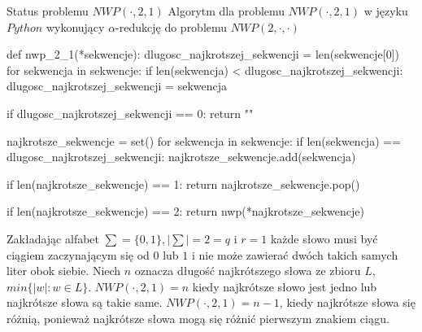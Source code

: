 \documentclass{article}
\begin{document}
\begin{section}
{Status problemu $NWP(\cdot, 2, 1)$}
Algorytm dla problemu $NWP(\cdot, 2, 1)$ w języku $Python$ wykonujący $\alpha$-redukcję do problemu $NWP(2, \cdot, \cdot)$
\begin{python}
def nwp_2_1(*sekwencje):
    dlugosc_najkrotszej_sekwencji = len(sekwencje[0])
    for sekwencja in sekwencje:
        if len(sekwencja) < dlugosc_najkrotszej_sekwencji:
            dlugosc_najkrotszej_sekwencji = sekwencja
    
    if dlugosc_najkrotszej_sekwencji == 0:
        return ""
            
    najkrotsze_sekwencje = set()
    for sekwencja in sekwencje:
        if len(sekwencja) == dlugosc_najkrotszej_sekwencji:
            najkrotsze_sekwencje.add(sekwencja)
            
    if len(najkrotsze_sekwencje) == 1:
        return najkrotsze_sekwencje.pop()

    if len(najkrotsze_sekwencje) == 2:
        return nwp(*najkrotsze_sekwencje)

\end{python}
 Zakładając alfabet $\sum = \{0, 1\}, |\sum| = 2 = q$ i $r=1$ każde słowo musi być ciągiem zaczynającym się od $0$ lub $1$
 i nie może zawierać dwóch takich samych liter obok siebie. Niech $n$ oznacza długość najkrótszego słowa ze zbioru $L$, 
 $min\{|w|: w \in L\}$. $NWP(\cdot, 2, 1) = n$ kiedy najkrótsze słowo jest jedno lub najkrótsze słowa są takie same.
 $NWP(\cdot, 2, 1) = n - 1$, kiedy najkrótsze słowa się różnią, ponieważ najkrótsze słowa mogą się różnić pierwszym znakiem 
 ciągu.

\end{section}


\printbibliography
\end{document}
